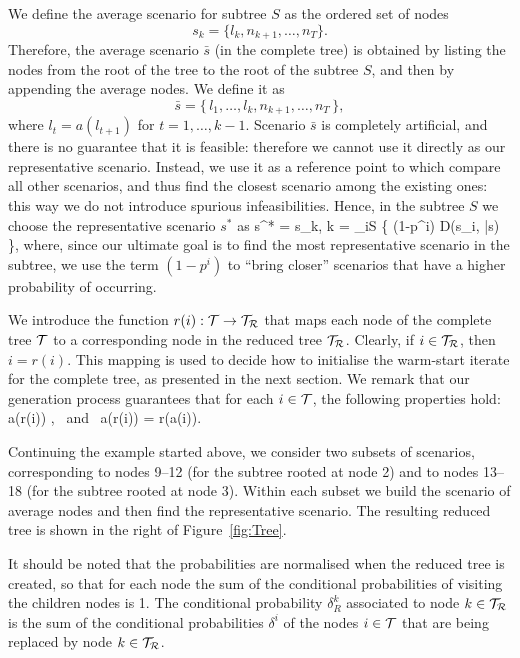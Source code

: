 We define the average scenario for subtree $S$ as the ordered
set of nodes 
\[
  s_k = \{ l_k, n_{k+1}, \ldots, n_T \}.
\]
Therefore, the average scenario $\bar s$ (in the complete tree) 
is obtained by listing the 
nodes from the root of the tree to the root of the subtree $S$, and 
then by appending the average nodes. We define it as
\[
\bar s = \{\, l_1, \ldots, l_k, n_{k+1}, \ldots, n_T \,\},
\]
where $l_t = a(l_{t+1})$ for $t = 1,\ldots, k-1$.
Scenario $\bar{s}$ is completely artificial, and there is no guarantee 
that it is feasible: therefore we cannot use it directly as our 
representative scenario. Instead, we use it as a reference point to 
which compare all other scenarios, and thus find the closest scenario 
among the existing ones: this way we do not introduce spurious 
infeasibilities. Hence, in the subtree $S$ we choose the 
representative scenario $s^*$ as 
%
\be  \label{repScenario}
   s^* = s_k, \quad k = \arg\min_{i\in S} \{ (1-p^i) D(s_i, \bar{s}) \},
\ee
%
where, since our ultimate goal is to find the most representative scenario in 
the subtree, we use the term $(1-p^i)$ to ``bring closer'' scenarios 
that have a higher probability of occurring.

We introduce the function $r(i): \mathcal{T} \to \mathcal{T}_\mathcal{R}$ that maps each
node of the complete tree $\mathcal{T}$ to a corresponding node in
the reduced tree $\mathcal{T}_\mathcal{R}$. Clearly, if $i \in \mathcal{T}_\mathcal{R}$, then
$i = r(i)$.
This mapping is used to decide how to initialise 
the warm-start iterate for the complete tree, as presented in the
next section. We remark that our generation process guarantees
that for each $i \in \mathcal{T}$, the following properties hold:
\be  \label{eq:ReducedTreeProperties}
  a(r(i)) \in \Rtree, \quad \mbox{ and } \quad a(r(i)) = r(a(i)).
\ee

Continuing the example started above, we consider two subsets of 
scenarios, corresponding to nodes 9--12 (for the subtree rooted at 
node 2) and to nodes 13--18 (for the subtree rooted at node 3). Within 
each subset we build the scenario of average nodes and then find the 
representative scenario.
The resulting reduced tree is shown in the right of Figure~\ref{fig:Tree}.

It should be noted that the probabilities are normalised when 
the reduced tree is created, so that for each node the sum of the
conditional probabilities of visiting the children nodes is 1.
The conditional probability $\delta_R^k$ associated to node $k \in \mathcal{T}_\mathcal{R}$
is the sum of the conditional probabilities $\delta^i$ of the nodes 
$i \in \mathcal{T}$ that are being replaced by node $k \in \mathcal{T}_\mathcal{R}$.

